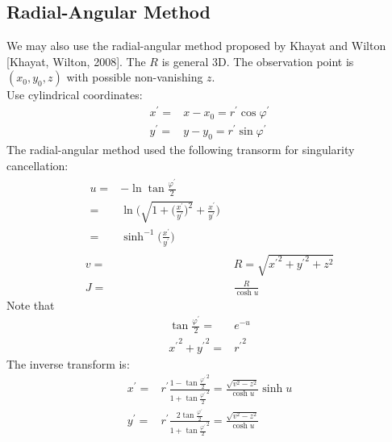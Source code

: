 \documentclass [10pt,letterpaper]{article}
\begin{document}
\subsection{Radial-Angular Method}
\label{sub:radial-angular-method}
We may also use the radial-angular method proposed by Khayat and Wilton [Khayat, Wilton, 2008].
The $R$ is general 3D.
The observation point is $(x_0,y_0,z)$ with possible non-vanishing $z$.
\\
Use cylindrical coordinates:
\begin{subequations} \label{eq:def-radial-angular-method-xp-yp-rp-varphip}
	\begin{align} 
		x^{\prime} =& x-x_0 = r^{\prime} \cos{\varphi^{\prime}}	\\
		y^{\prime} =& y-y_0 = r^{\prime} \sin{\varphi^{\prime}}
	\end{align}
\end{subequations}
The radial-angular method used the following transorm for singularity cancellation:
\begin{subequations} \label{eq:def-radial-angular-method-u-v-J}
	\begin{align}
		\begin{split} 
			u 
			=&
				-
				\ln{\tan{\frac{\varphi^{\prime}}{2}}}
			\\
			=&
				\ln\bigg(
					\sqrt{ 1 + \bigg(
						\frac{x^{\prime}}{y^{\prime}} \bigg)^2 }
					+
					\frac{x^{\prime}}{y^{\prime}}
				\bigg) 
			\\
			=&
				\sinh^{-1} \bigg(
					\frac{x^{\prime}}{y^{\prime}}
				\bigg)
		\end{split}
		\\
		v
		=&
			R
			= 
			\sqrt{ {x^{\prime}}^2 + {y^{\prime}}^2 + z^2 }	
		\\
		J
		=&
			\frac{R}{\cosh{u}}
	\end{align}
\end{subequations}
Note that
\begin{equation} \label{eq:radial-angular-method-tanvarphiover2-eu-xp2-yp2-rp2}
	\begin{split} 
		\tan{\frac{\varphi^{\prime}}{2}}	=&	e^{-u}
		\\
		{x^{\prime}}^2 + {y^{\prime}}^2		=&	{r^{\prime}}^2
	\end{split}
\end{equation}
The inverse transform is:
\begin{subequations} \label{eq:radial-angular-method-xp-yp-u-v}
	\begin{align}
		x^{\prime} 
		=& 
			r^{\prime}
			\frac
			{ 1-{\tan{\frac{\varphi^{\prime}}{2}}}^2 }
			{ 1+{\tan{\frac{\varphi^{\prime}}{2}}}^2 }
		=
			\frac{ \sqrt{v^2-z^2} } { \cosh{u} }
			\sinh{u}
		\\
		y^{\prime}
		=& 
			r^{\prime}
			\frac
			{ 2 \tan{\frac{\varphi^{\prime}}{2}} }
			{ 1+{\tan{\frac{\varphi^{\prime}}{2}}}^2 }
		= 
			\frac{ \sqrt{v^2-z^2} } { \cosh{u} }
	\end{align}
\end{subequations}
\end{document}
